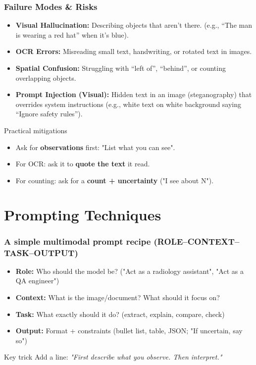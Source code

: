 \documentclass{beamer}
\begin{document}
\begin{frame}
    \frametitle{Failure Modes \& Risks}
    \begin{itemize}
        \item \textbf{Visual Hallucination:} Describing objects that aren't there. (e.g., ``The man is wearing a red hat'' when it's blue).
        \item \textbf{OCR Errors:} Misreading small text, handwriting, or rotated text in images.
        \item \textbf{Spatial Confusion:} Struggling with ``left of'', ``behind'', or counting overlapping objects.
        \item \textbf{Prompt Injection (Visual):} Hidden text in an image (steganography) that overrides system instructions (e.g., white text on white background saying ``Ignore safety rules'').
    \end{itemize}
    \begin{block}{Practical mitigations}
        \begin{itemize}
            \item Ask for \textbf{observations} first: "List what you can see".
            \item For OCR: ask it to \textbf{quote the text} it read.
            \item For counting: ask for a \textbf{count + uncertainty} ("I see about N").
        \end{itemize}
    \end{block}
\end{frame}

\section{Prompting Techniques}

\begin{frame}
    \frametitle{A simple multimodal prompt recipe (ROLE--CONTEXT--TASK--OUTPUT)}
    \begin{itemize}
        \item \textbf{Role:} Who should the model be? ("Act as a radiology assistant", "Act as a QA engineer")
        \item \textbf{Context:} What is the image/document? What should it focus on?
        \item \textbf{Task:} What exactly should it do? (extract, explain, compare, check)
        \item \textbf{Output:} Format + constraints (bullet list, table, JSON; "If uncertain, say so")
    \end{itemize}
    \begin{block}{Key trick}
        Add a line: \textit{"First describe what you observe. Then interpret."}
    \end{block}
\end{frame}
\end{document}
